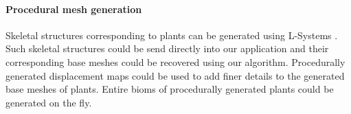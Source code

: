 \paragraph{Procedural mesh generation}
Skeletal structures corresponding to plants can be generated using L-Systems \cite{lplants}.
Such skeletal structures could be send directly into our application and their corresponding base meshes could be recovered using our algorithm.
Procedurally generated displacement maps could be used to add finer details to the generated base meshes of plants.
Entire bioms of procedurally generated plants could be generated on the fly.